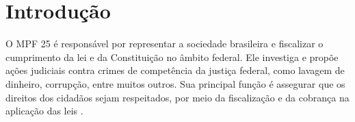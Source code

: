 \section{Introdução}

O MPF 25 é responsável por representar a sociedade brasileira e fiscalizar o cumprimento da lei e da Constituição no âmbito federal. Ele investiga e propõe ações judiciais contra crimes de competência da justiça federal, como lavagem de dinheiro, corrupção, entre muitos outros. Sua principal função é assegurar que os direitos dos cidadãos sejam respeitados, por meio da fiscalização e da cobrança na aplicação das leis \cite{Sobre_o_MPF}.

